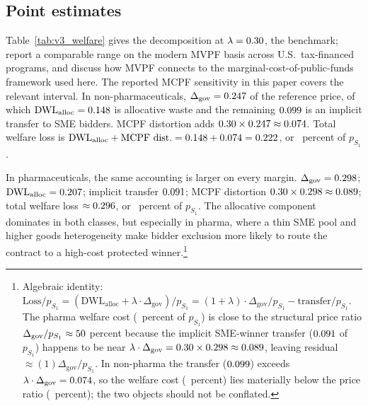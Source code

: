 \subsection{Point estimates}

Table~\ref{tab:v3_welfare} gives the decomposition at $\lambda = 0.30$, the \citet{ballard1985} benchmark; \citet{hendren2020} report a comparable range on the modern MVPF basis across U.S.\ tax-financed programs, and \citet{finkelstein2020} discuss how MVPF connects to the marginal-cost-of-public-funds framework used here. The reported MCPF sensitivity in this paper covers the relevant interval. In non-pharmaceuticals, $\Delta_{\text{gov}} = 0.247$ of the reference price, of which $\mathrm{DWL}_{\text{alloc}} = 0.148$ is allocative waste and the remaining $0.099$ is an implicit transfer to SME bidders. MCPF distortion adds $0.30 \times 0.247 \approx 0.074$. Total welfare loss is $\mathrm{DWL}_{\text{alloc}} + \mathrm{MCPF\ dist.} = 0.148 + 0.074 = 0.222$, or \welfLossPctLthirtyNp~percent of $p_{S_1}$.

In pharmaceuticals, the same accounting is larger on every margin. $\Delta_{\text{gov}} = 0.298$; $\mathrm{DWL}_{\text{alloc}} = 0.207$; implicit transfer $0.091$; MCPF distortion $0.30 \times 0.298 \approx 0.089$; total welfare loss $\approx 0.296$, or \welfLossPctLthirtyPh~percent of $p_{S_1}$. The allocative component dominates in both classes, but especially in pharma, where a thin SME pool and higher goods heterogeneity make bidder exclusion more likely to route the contract to a high-cost protected winner.\footnote{Algebraic identity: $\mathrm{Loss}/p_{S_1} = (\mathrm{DWL}_{\text{alloc}} + \lambda \cdot \Delta_{\text{gov}})/p_{S_1} = (1 + \lambda) \cdot \Delta_{\text{gov}}/p_{S_1} - \mathrm{transfer}/p_{S_1}$. The pharma welfare cost (\welfLossPctLthirtyPh~percent of $p_{S_1}$) is close to the structural price ratio $\Delta_{\text{gov}}/p_{S_1} \approx 50$ percent because the implicit SME-winner transfer ($0.091$ of $p_{S_1}$) happens to be near $\lambda \cdot \Delta_{\text{gov}} = 0.30 \times 0.298 \approx 0.089$, leaving residual $\approx (1)\Delta_{\text{gov}}/p_{S_1}$. In non-pharma the transfer ($0.099$) exceeds $\lambda \cdot \Delta_{\text{gov}} = 0.074$, so the welfare cost (\welfLossPctLthirtyNp~percent) lies materially below the price ratio (\welfPriceRatioNpFn~percent); the two objects should not be conflated.}

